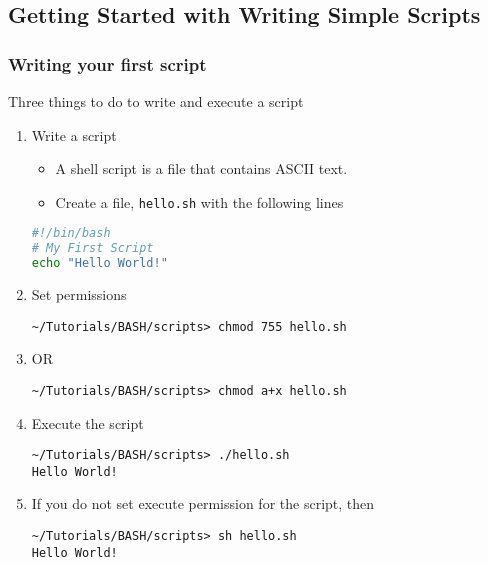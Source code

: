 \documentclass[10pt,t]{beamer}
\begin{document}
\subsection{Getting Started with Writing Simple Scripts}
\begin{frame}[fragile]
  \frametitle{Writing your first script}
  \vspace{-0.25cm}
  \begin{block}{Three things to do to write and execute a script}
    \begin{enumerate}
      \item Write a script
      \begin{itemize}
        \item A shell script is a file that contains ASCII text. 
        \item Create a file, \texttt{hello.sh} with the following lines 
      \end{itemize}
      \begin{lstlisting}[language=bash]
#!/bin/bash
# My First Script
echo "Hello World!"
      \end{lstlisting}
      \item Set permissions
      \begin{lstlisting}[style=LINUX]
~/Tutorials/BASH/scripts> chmod 755 hello.sh 
      \end{lstlisting}
      \item[] OR
      \begin{lstlisting}[style=LINUX]
~/Tutorials/BASH/scripts> chmod a+x hello.sh 
      \end{lstlisting}
      \item Execute the script
      \begin{lstlisting}[style=LINUX]
~/Tutorials/BASH/scripts> ./hello.sh 
Hello World!
      \end{lstlisting}
      \item If you do not set execute permission for the script, then
        \begin{lstlisting}[style=LINUX]
~/Tutorials/BASH/scripts> sh hello.sh
Hello World!
      \end{lstlisting}
    \end{enumerate}
  \end{block}
\end{frame}
\end{document}
